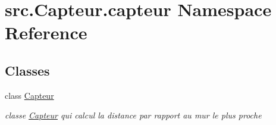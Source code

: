 \hypertarget{namespacesrc_1_1_capteur_1_1capteur}{}\section{src.\+Capteur.\+capteur Namespace Reference}
\label{namespacesrc_1_1_capteur_1_1capteur}
\subsection*{Classes}
\begin{DoxyCompactItemize}
\item 
class \hyperlink{classsrc_1_1_capteur_1_1capteur_1_1_capteur}{Capteur}
\begin{DoxyCompactList}\small\item\em classe \hyperlink{classsrc_1_1_capteur_1_1capteur_1_1_capteur}{Capteur} qui calcul la distance par rapport au mur le plus proche \end{DoxyCompactList}\end{DoxyCompactItemize}
